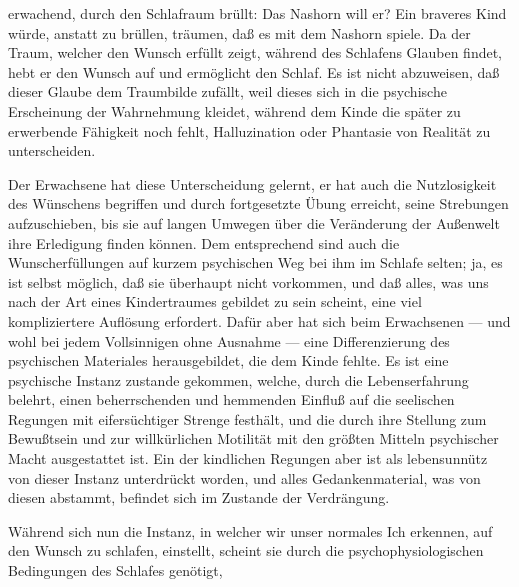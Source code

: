 \documentclass[twoside=true,titlepage=false,open=any, parskip=never, fontsize=10pt, headings=small, chapterprefix=false, appendixprefix=false]{scrbook}
\begin{document}
         
            
            
            
        \pstart
        erwachend, durch den Schlafraum brüllt: Das
                  Nashorn will er? Ein braveres Kind würde, anstatt zu brüllen, träumen, daß es mit dem Nashorn spiele. Da der
               Traum, welcher den Wunsch erfüllt zeigt, während des Schlafens Glauben findet, hebt er den Wunsch auf und
               ermöglicht den Schlaf. Es ist nicht abzuweisen, daß dieser Glaube dem
               Traumbilde zufällt, weil dieses sich in die psychische Erscheinung der
               Wahrnehmung kleidet, während dem Kinde die später zu erwerbende Fähigkeit
               noch fehlt, Halluzination oder Phantasie von Realität zu unterscheiden.
        \pend
    
            
        \pstart
        Der Erwachsene hat diese Unterscheidung gelernt, er hat auch die Nutzlosigkeit
               des Wünschens begriffen und durch fortgesetzte Übung erreicht, seine Strebungen
               aufzuschieben, bis sie auf langen Umwegen über die Veränderung der Außenwelt
               ihre Erledigung finden können. Dem entsprechend sind auch die
               Wunscherfüllungen auf kurzem psychischen Weg bei ihm im Schlafe selten; ja,
               es ist selbst möglich, daß sie überhaupt nicht vorkommen, und daß alles,
               was uns nach der Art eines Kindertraumes gebildet zu sein scheint, eine viel
               kompliziertere Auflösung erfordert. Dafür aber hat sich beim Erwachsenen — und
               wohl bei jedem Vollsinnigen ohne Ausnahme — eine Differenzierung des psychischen
               Materiales herausgebildet, die dem Kinde fehlte. Es ist eine psychische
               Instanz zustande gekommen, welche, durch die Lebenserfahrung belehrt, einen
               beherrschenden und hemmenden Einfluß auf die seelischen Regungen mit
               eifersüchtiger Strenge festhält, und die durch ihre Stellung zum Bewußtsein und
               zur willkürlichen Motilität mit den größten Mitteln psychischer Macht
               ausgestattet ist. Ein  der kindlichen Regungen aber ist als
               lebensunnütz von dieser Instanz unterdrückt worden, und alles Gedankenmaterial, was von diesen abstammt, befindet sich im Zustande der
               Verdrängung.
        \pend
    
            
        \pstart
        Während sich nun die Instanz, in welcher wir unser normales Ich erkennen, auf
               den Wunsch zu schlafen, einstellt, scheint sie durch die psychophysiologischen
               Bedingungen des Schlafes genötigt,
        \pend
    
\end{document}
